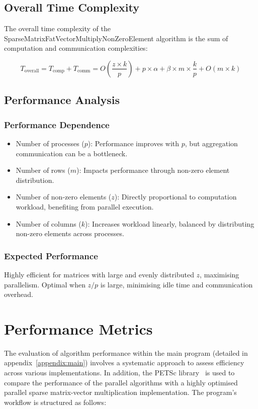\documentclass[12pt,oneside]{book} %
\begin{document}
\subsection{Overall Time Complexity}
The overall time complexity of the SparseMatrixFatVectorMultiplyNonZeroElement
algorithm is the sum of computation and communication complexities:

\begin{equation}
    T_{\text{overall}} = T_{\text{comp}} + T_{\text{comm}} = O\left(\frac{z \times k}{p}\right) + p \times \alpha + \beta \times m \times \frac{k}{p} + O(m \times k)
\end{equation}

\subsection{Performance Analysis}
\subsubsection{Performance Dependence}
\begin{itemize}
    \item Number of processes ($p$): Performance improves with $p$, but aggregation
          communication can be a bottleneck.
    \item Number of rows ($m$): Impacts performance through non-zero element
          distribution.
    \item Number of non-zero elements ($z$): Directly proportional to computation
          workload, benefiting from parallel execution.
    \item Number of columns ($k$): Increases workload linearly, balanced by distributing
          non-zero elements across processes.
\end{itemize}

\subsubsection{Expected Performance}
Highly efficient for matrices with large and evenly distributed $z$, maximising
parallelism. Optimal when $z/p$ is large, minimising idle time and
communication overhead.

\newpage
\section{Performance Metrics}
The evaluation of algorithm performance within the main program (detailed in
appendix~\ref{appendix:main}) involves a systematic approach to assess
efficiency across various implementations. In addition, the PETSc
library~\cite{petsc-web-page} is used to compare the performance of the
parallel algorithms with a highly optimised parallel sparse matrix-vector
multiplication implementation. The program's workflow is structured as follows:
\end{document}
